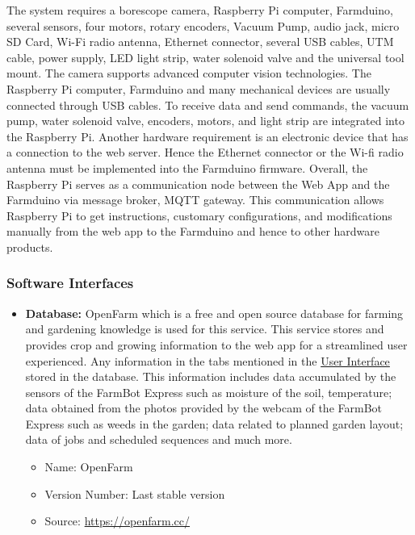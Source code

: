 The system requires a borescope camera, Raspberry Pi computer, Farmduino, several sensors, four motors, rotary encoders, Vacuum Pump, audio jack, micro SD Card, Wi-Fi radio antenna, Ethernet connector, several USB cables, UTM cable, power supply, LED light strip, water solenoid valve and the universal tool mount. The camera supports advanced computer vision technologies. The Raspberry Pi computer, Farmduino and many mechanical devices are usually connected through USB cables. To receive data and send commands, the vacuum pump, water solenoid valve, encoders, motors, and light strip are integrated into the Raspberry Pi. Another hardware requirement is an electronic device that has a connection to the web server. Hence the Ethernet connector or the Wi-fi radio antenna must be implemented into the Farmduino firmware. Overall, the Raspberry Pi serves as a communication node between the Web App and the Farmduino via message broker, MQTT gateway. This communication allows Raspberry Pi to get instructions, customary configurations, and modifications manually from the web app to the Farmduino and hence to other hardware products.


\subsubsection{Software Interfaces}
\begin{itemize}
	\item \textbf{Database: } OpenFarm which is a free and open source database for farming and gardening knowledge is used for this service. This service stores and provides crop and growing information to the web app for a streamlined user experienced. Any information in the tabs mentioned in the \hyperref[subsubsection.1.3.1.2]{User Interface} stored in the database. This information includes data accumulated by the sensors of the FarmBot Express such as moisture of the soil, temperature; data obtained from the photos provided by the webcam of the FarmBot Express such as weeds in the garden; data related to planned garden layout; data of jobs and scheduled sequences and much more. 
	\begin{itemize}
		\item Name: OpenFarm
		\item Version Number: Last stable version
		\item Source: \url{https://openfarm.cc/}
	\end{itemize}
	
	
\end{itemize}


